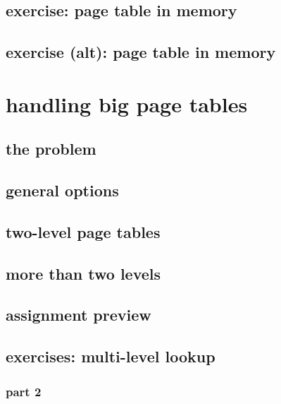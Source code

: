 \subsection{exercise: page table in memory}

\subsection{exercise (alt): page table in memory}


\section{handling big page tables}
\subsection{the problem}


\subsection{general options}


\subsection{two-level page tables}



\subsection{more than two levels}


\subsection{assignment preview}

\subsection{exercises: multi-level lookup}
\subsubsection{part 2}

